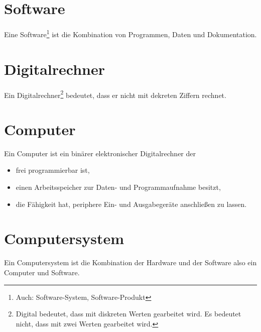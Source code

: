 \documentclass[../main.tex]{subfiles}
\begin{document}
    \section{Software}
        Eine Software\footnote{Auch: Software-System, Software-Produkt} ist die Kombination von Programmen, Daten und Dokumentation.
    
    \section{Digitalrechner}
        Ein Digitalrechner\footnote{Digital bedeutet, dass mit diskreten Werten gearbeitet wird. Es bedeutet nicht, dass mit zwei Werten gearbeitet wird.} bedeutet, dass er nicht mit dekreten Ziffern rechnet.
        
    \section{Computer}
        Ein Computer ist ein binärer elektronischer Digitalrechner der
        
        \begin{itemize}
            \item frei programmierbar ist,
            \item einen Arbeitsspeicher zur Daten- und Programmaufnahme besitzt,
            \item die Fähigkeit hat, periphere Ein- und Ausgabegeräte anschließen zu lassen.
        \end{itemize}
        
    \section{Computersystem}
        Ein Computersystem ist die Kombination der Hardware und der Software also ein Computer und Software.
    
\end{document}
